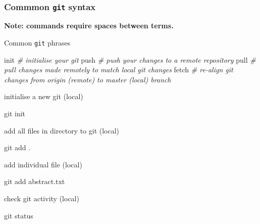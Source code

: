 \documentclass[10,portrait]{article}
\newenvironment{Shaded}{\begin{snugshade}}{\end{snugshade}}
\newcommand{\CommentTok}[1]{\textcolor[rgb]{0.56,0.35,0.01}{\textit{#1}}}
\newcommand{\FunctionTok}[1]{\textcolor[rgb]{0.00,0.00,0.00}{#1}}
\newcommand{\ExtensionTok}[1]{#1}
\newcommand{\NormalTok}[1]{#1}
\begin{document}
~

\subsubsection{\texorpdfstring{Commmon \texttt{git}
syntax}{Commmon git syntax}}\label{commmon-git-syntax}

\textbf{Note: commands require spaces between terms.}

Common \texttt{git} phrases

\begin{Shaded}
\begin{Highlighting}[]
\ExtensionTok{init} \CommentTok{# initialise your git  }
\ExtensionTok{push} \CommentTok{# push your changes to a remote repository  }
\ExtensionTok{pull} \CommentTok{# pull changes made remotely to match local git changes  }
\ExtensionTok{fetch} \CommentTok{# re-align git changes from origin (remote) to master (local) branch  }
\end{Highlighting}
\end{Shaded}

initialise a new git (local)

\begin{Shaded}
\begin{Highlighting}[]
\FunctionTok{git}\NormalTok{ init  }
\end{Highlighting}
\end{Shaded}

add all files in directory to git (local)

\begin{Shaded}
\begin{Highlighting}[]
\FunctionTok{git}\NormalTok{ add .}
\end{Highlighting}
\end{Shaded}

add individual file (local)

\begin{Shaded}
\begin{Highlighting}[]
\FunctionTok{git}\NormalTok{ add abstract.txt}
\end{Highlighting}
\end{Shaded}

check git activity (local)

\begin{Shaded}
\begin{Highlighting}[]
\FunctionTok{git}\NormalTok{ status }
\end{Highlighting}
\end{Shaded}
\end{document}
